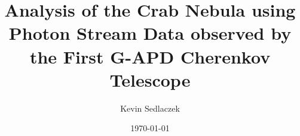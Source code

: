 \documentclass[
  tucolor,
  BCOR=12mm,     %
  parskip=half,  %
  open=any,      %
  cleardoublepage=plain,  %
]{tudothesis}
\author{Kevin Sedlaczek}
\title{Analysis of the Crab Nebula using Photon Stream Data observed by the First G-APD Cherenkov Telescope}
\date{\today}
\begin{document}
\frontmatter
% 
\maketitle

\makecorrectorpage


\tableofcontents

\mainmatter












\appendix


\backmatter
\printbibliography

\cleardoublepage

\end{document}
